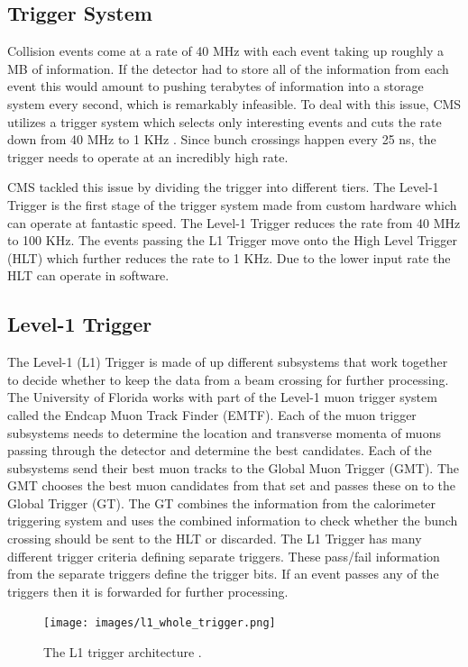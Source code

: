 \subsection{Trigger System}
Collision events come at a rate of 40 MHz with each event taking up roughly a MB of information. If the detector had to store all of the information from each event this would amount to pushing terabytes of information into a storage system every second, which is remarkably infeasible. To deal with this issue, CMS utilizes a trigger system which selects only interesting events and cuts the rate down from 40 MHz to 1 KHz \cite{cmsexp}. Since bunch crossings happen every 25 ns, the trigger needs to operate at an incredibly high rate.

CMS tackled this issue by dividing the trigger into different tiers. The Level-1 Trigger is the first stage of the trigger system made from custom hardware which can operate at fantastic speed. The Level-1 Trigger reduces the rate from 40 MHz to 100 KHz. The events passing the L1 Trigger move onto the High Level Trigger (HLT) which further reduces the rate to 1 KHz. Due to the lower input rate the HLT can operate in software.

\subsection{Level-1 Trigger}

The Level-1 (L1) Trigger is made of up different subsystems that work together to decide whether to keep the data from a beam crossing for further processing. The University of Florida works with part of the Level-1 muon trigger system called the Endcap Muon Track Finder (EMTF). Each of the muon trigger subsystems needs to determine the location and transverse momenta of muons passing through the detector and determine the best candidates. Each of the subsystems send their best muon tracks to the Global Muon Trigger (GMT). The GMT chooses the best muon candidates from that set and passes these on to the Global Trigger (GT). The GT combines the information from the calorimeter triggering system and uses the combined information to check whether the bunch crossing should be sent to the HLT or discarded. The L1 Trigger has many different trigger criteria defining separate triggers. These pass/fail information from the separate triggers define the trigger bits. If an event passes any of the triggers then it is forwarded for further processing.

\begin{figure}[h!]
  \centering
  \texttt{[image: images/l1\_whole\_trigger.png]}
  \caption[The L1 trigger architecture.]
   {The L1 trigger architecture \cite{tdr2013}.}
  \label{fig:l1trigarch}
\end{figure}

